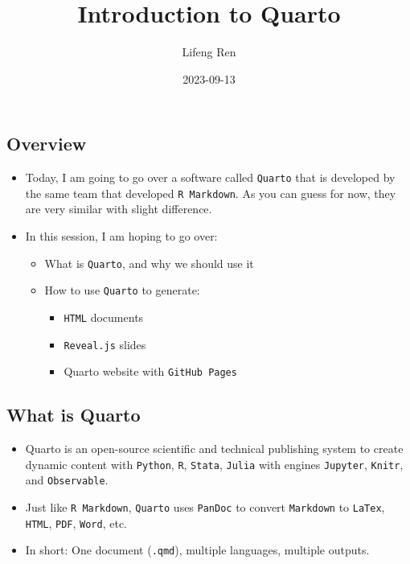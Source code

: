 \documentclass[
  letterpaper,
  DIV=11,
  numbers=noendperiod]{scrartcl}
\title{Introduction to Quarto}
\author{Lifeng Ren}
\date{2023-09-13}
\providecommand{\tightlist}{%
  \setlength{\itemsep}{0pt}\setlength{\parskip}{0pt}}\usepackage{longtable,booktabs,array}
\begin{document}
\maketitle
\ifdefined\Shaded\renewenvironment{Shaded}{\begin{tcolorbox}[interior hidden, borderline west={3pt}{0pt}{shadecolor}, sharp corners, boxrule=0pt, enhanced, frame hidden, breakable]}{\end{tcolorbox}}\fi

\hypertarget{overview}{%
\subsection{Overview}\label{overview}}

\begin{itemize}
\tightlist
\item
  Today, I am going to go over a software called \texttt{Quarto} that is
  developed by the same team that developed \texttt{R\ Markdown}. As you
  can guess for now, they are very similar with slight difference.
\item
  In this session, I am hoping to go over:

  \begin{itemize}
  \tightlist
  \item
    What is \texttt{Quarto}, and why we should use it
  \item
    How to use \texttt{Quarto} to generate:

    \begin{itemize}
    \tightlist
    \item
      \texttt{HTML} documents
    \item
      \texttt{Reveal.js} slides
    \item
      Quarto website with \texttt{GitHub\ Pages}
    \end{itemize}
  \end{itemize}
\end{itemize}

\hypertarget{what-is-quarto}{%
\subsection{What is Quarto}\label{what-is-quarto}}

\begin{itemize}
\item
  Quarto is an open-source scientific and technical publishing system to
  create dynamic content with \texttt{Python}, \texttt{R},
  \texttt{Stata}, \texttt{Julia} with engines \texttt{Jupyter},
  \texttt{Knitr}, and \texttt{Observable}.
\item
  Just like \texttt{R\ Markdown}, \texttt{Quarto} uses \texttt{PanDoc}
  to convert \texttt{Markdown} to \texttt{LaTex}, \texttt{HTML},
  \texttt{PDF}, \texttt{Word}, etc.
\item
  In short: One document (\texttt{.qmd}), multiple languages, multiple
  outputs.
\end{itemize}
\end{document}
